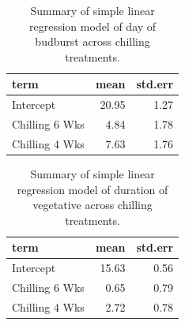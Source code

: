 \documentclass{article}\usepackage[]{graphicx}\usepackage[]{color}
\begin{document}
\begin{table}[H]
\centering
\caption{Summary of simple linear regression model of day of budburst across chilling treatments.} 
\label{tab:simpbb}
\begin{tabular}{lrr}
  \hline
term & mean & std.err \\ 
  \hline
Intercept & 20.95 & 1.27 \\ 
  Chilling 6 Wks & 4.84 & 1.78 \\ 
  Chilling 4 Wks & 7.63 & 1.76 \\ 
   \hline
\end{tabular}
\end{table}
\begin{table}[H]
\centering
\caption{Summary of simple linear regression model of duration of vegetative across chilling treatments.} 
\label{tab:simpdvr}
\begin{tabular}{lrr}
  \hline
term & mean & std.err \\ 
  \hline
Intercept & 15.63 & 0.56 \\ 
  Chilling 6 Wks & 0.65 & 0.79 \\ 
  Chilling 4 Wks & 2.72 & 0.78 \\ 
   \hline
\end{tabular}
\end{table}
\end{document}
